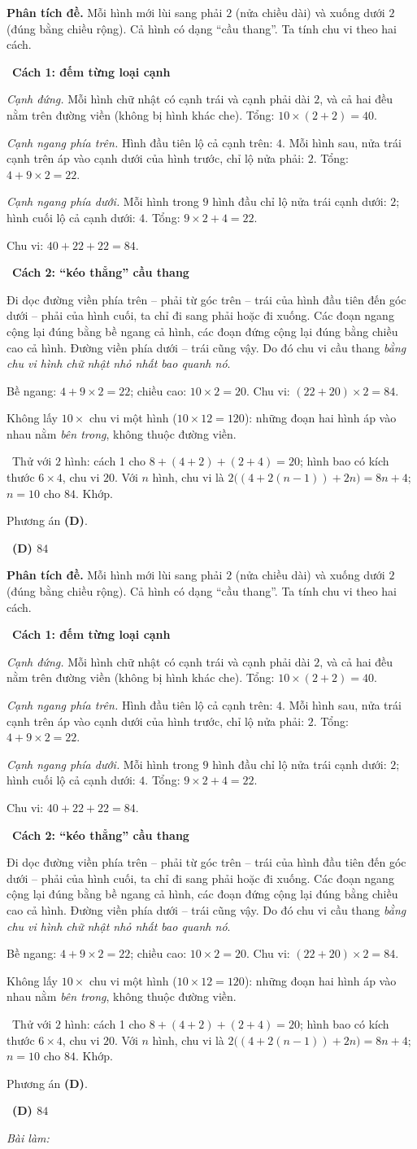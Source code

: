 \documentclass[11pt]{article}
\newif\ifsol \soltrue
\providecommand{\AnsWord}{Đáp số}
\newcommand{\ans}[1]{\par\smallskip{\bfseries\color{tmGreen!88!black}\AnsWord:}\ {\bfseries\color{AnsRed}#1}\par}
\newcommand{\probsol}[1]{%
  \begin{lrbox}{\solmeasure}\begin{minipage}{\dimexpr\linewidth-24pt\relax}#1\end{minipage}\end{lrbox}%
  \ifsol
    \begin{solbox}#1\end{solbox}%
  \else
    \setlength{\solht}{\dimexpr\ht\solmeasure+\dp\solmeasure+0.85cm\relax}%
    \ifdim\solht<1.35cm\setlength{\solht}{1.35cm}\fi
    \ifdim\solht>\StudentMaxWork\setlength{\solht}{\StudentMaxWork}\fi
    \begin{tcolorbox}[colback=white,colframe=Line,boxrule=0.8pt,arc=5pt,
      left=8pt,right=8pt,top=4pt,bottom=4pt,height=\solht]{\footnotesize\color{Slate}\itshape\WorkWord}\end{tcolorbox}%
  \fi}
\newlength{\StudentMaxWork}\setlength{\StudentMaxWork}{7.5cm}
\newcommand{\step}[2]{\par\smallskip\noindent{\bfseries\color{tmBlue!85!black}\StepWord~#1.}\ {\bfseries #2}\par\nopagebreak}
\newcommand{\verify}[1]{\par\smallskip\noindent{\bfseries\color{tmGreen!80!black}\faCheckCircle\ \CheckWord}\ #1\par}
\def\WorkWord{Bài làm:}
\def\AnsWord{Đáp số}
\def\StepWord{Bước}
\def\CheckWord{Thử lại:}
\begin{document}
\probsol{
\textbf{Phân tích đề.} Mỗi hình mới lùi sang phải $2$ (nửa chiều dài) và xuống dưới $2$ (đúng bằng chiều
rộng). Cả hình có dạng ``cầu thang''. Ta tính chu vi theo hai cách.

\step{1}{Cách 1: đếm từng loại cạnh}
\emph{Cạnh đứng.} Mỗi hình chữ nhật có cạnh trái và cạnh phải dài $2$, và cả hai đều nằm trên đường viền
(không bị hình khác che). Tổng: $10\times(2+2)=40$.

\emph{Cạnh ngang phía trên.} Hình đầu tiên lộ cả cạnh trên: $4$. Mỗi hình sau, nửa trái cạnh trên áp vào
cạnh dưới của hình trước, chỉ lộ nửa phải: $2$. Tổng: $4+9\times 2=22$.

\emph{Cạnh ngang phía dưới.} Mỗi hình trong $9$ hình đầu chỉ lộ nửa trái cạnh dưới: $2$; hình cuối lộ cả
cạnh dưới: $4$. Tổng: $9\times 2+4=22$.

Chu vi: $40+22+22=84$.

\step{2}{Cách 2: ``kéo thẳng'' cầu thang}
\begin{proofbox}Đi dọc đường viền phía trên -- phải từ góc trên -- trái của hình đầu tiên đến góc dưới --
phải của hình cuối, ta chỉ đi sang phải hoặc đi xuống. Các đoạn ngang cộng lại đúng bằng bề ngang cả hình,
các đoạn đứng cộng lại đúng bằng chiều cao cả hình. Đường viền phía dưới -- trái cũng vậy. Do đó chu vi
cầu thang \emph{bằng chu vi hình chữ nhật nhỏ nhất bao quanh nó}.\end{proofbox}
Bề ngang: $4+9\times 2=22$; chiều cao: $10\times 2=20$. Chu vi: $(22+20)\times 2=84$.

\begin{warnbox}Không lấy $10\times$ chu vi một hình ($10\times 12=120$): những đoạn hai hình áp vào nhau
nằm \emph{bên trong}, không thuộc đường viền.\end{warnbox}
\verify{Thử với $2$ hình: cách 1 cho $8+(4+2)+(2+4)=20$; hình bao có kích thước $6\times 4$, chu vi $20$.
Với $n$ hình, chu vi là $2\big((4+2(n-1))+2n\big)=8n+4$; $n=10$ cho $84$. Khớp.}
Phương án \textbf{(D)}.
\ans{(D) $84$}
}
\end{document}

